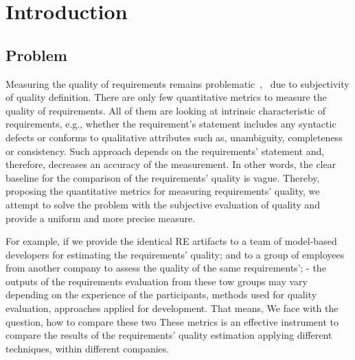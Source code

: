 \section{Introduction}
\label{sec:Intro} 

\subsection{Problem}
Measuring the quality of requirements remains problematic~\cite{Fernandez2016},~\cite{Mund:2017} 
due to subjectivity of quality definition. There are only few quantitative metrics to measure the quality of requirements. 
All of them are looking at intrinsic characteristic of requirements, e.g., whether the requirement’s statement 
includes any syntactic defects or conforms to qualitative attributes such as, unambiguity, completeness or consistency. 
Such approach depends on the requirements' statement and, therefore, decreases an accuracy of the measurement. 
In other words, the clear baseline for the comparison of the requirements' quality is vague. 
Thereby, proposing the quantitative metrics for measuring requirements' quality, we attempt 
to solve the problem with the subjective evaluation of quality and provide a uniform and more precise measure. 
 
For example, if we provide the identical RE artifacts to a team of model-based developers for estimating the requirements' quality; 
and to a group of employees from another company to assess the quality of the same requirements';
- the outputs of the requirements evaluation from these tow groups may vary depending on the experience of the participants, 
 methods used for quality evaluation, approaches applied for development. That means, We face with the question, how to compare these two 
These metrics is an effective instrument to compare the results of the requirements' quality estimation applying different techniques, within different companies.


